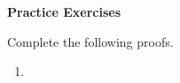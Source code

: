 \def\figdir{/storage/emulated/0/Documents/documents/latex/1920/Grade-8/3rd/proving-two-triangles-are-congruent/f}

\textbf{Practice Exercises}

\vspce

Complete the following proofs. 
\begin{enumerate}[label = \arabic*. ]
\item %

\end{enumerate}  







 


